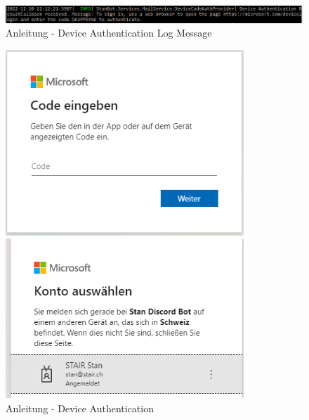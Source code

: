 \documentclass[a4paper, table]{article}
\begin{document}
\begin{figure}[h]
    \centering
    \hspace*{-2cm}
    \includegraphics[width=1.3\textwidth]{img/Tut_deviceAuthLog.png}
    \caption{Anleitung - Device Authentication Log Message}
    \label{fig:tutorial-device-auth-log}
\end{figure}

\begin{figure}[h]
    \begin{minipage}[t]{0.5\textwidth}
        \includegraphics[width=0.8\textwidth]{img/Tut_deviceAuthLogin.png}
    \end{minipage}
    \begin{minipage}[t]{0.5\textwidth}
        \includegraphics[width=0.8\textwidth]{img/Tut_deviceAuthAccount.png}
    \end{minipage}
    \caption{Anleitung - Device Authentication}
    \label{fig:tutorial-device-auth}
\end{figure}
\end{document}
